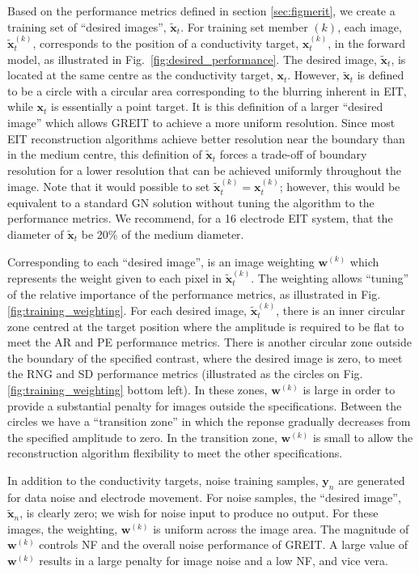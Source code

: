 \documentclass[12pt]{iopart}
\newcommand{\xB}{\mbox{$\mathbf{x}$}}
\newcommand{\xT}{\mbox{$\mathbf{\tilde x}$}}
\newcommand{\yB}{\mbox{$\mathbf{y}$}}
\newcommand{\wB}{\mbox{$\mathbf{w}$}}
\begin{document}
Based on the performance metrics defined
in section \ref{sec:figmerit},
we create a training set of ``desired images'', $\xT_t$.
For training set member $(k)$, each image, $\xT_t^{(k)}$,
corresponds to the position of a conductivity target,
$\xB_t^{(k)}$, in the forward model, as illustrated
in Fig.\ \ref{fig:desired_performance}. The desired
image, $\xT_t$, is located at the same centre as the
conductivity target, $\xB_t$. However,
$\xT_t$ is defined to be a circle with a circular
area corresponding to the blurring inherent in EIT,
while $\xB_t$ is essentially a point target. It is this
definition of a larger ``desired image'' which allows
GREIT to achieve a more uniform resolution.
Since most EIT reconstruction algorithms
achieve better resolution near the boundary than in the medium
centre, this definition of $\xT_t$ forces a trade-off
of boundary resolution for a lower resolution that
can be achieved uniformly throughout the image.
Note that it would possible to set
$\xT_t^{(k)} = \xB_t^{(k)}$; however, this would be equivalent to a standard
GN solution without tuning the algorithm to the 
performance metrics.
We recommend, for a 16 electrode
EIT system, that the diameter of $\xT_t$
be 20\% of the medium diameter.

Corresponding to each ``desired image'', is an image
weighting $\wB^{(k)}$ which represents the weight given to 
each pixel in $\xT_t^{(k)}$. The weighting allows ``tuning''
of the relative importance of the performance metrics,
as illustrated in Fig. \ref{fig:training_weighting}.
For each desired image, $\xT_t^{(k)}$, there is an inner
circular zone centred at the target position
where the amplitude is required to be
flat to meet the AR and PE performance metrics.
There is another circular zone outside the boundary
of the specified contrast, where the desired image
is zero, to meet the RNG and SD performance metrics
(illustrated as the circles on Fig. 
\ref{fig:training_weighting} bottom left).
In these zones, $\wB^{(k)}$ is large in order to
provide a substantial penalty for images outside the
specifications. Between the circles we have a 
``transition zone'' in which the reponse gradually
decreases from the specified amplitude to zero.
In the transition zone, $\wB^{(k)}$ is small to allow 
the reconstruction algorithm flexibility to meet the
other specifications.

In addition to the conductivity targets, noise
training samples, $\yB_n$ are generated for
data noise and electrode movement.
For noise samples, the ``desired image'', $\xT_n$,
is clearly zero; we wish for noise input to produce no output.
For these images, the weighting, $\wB^{(k)}$ is
uniform across the image area. The magnitude
of $\wB^{(k)}$ controls NF and the overall noise
performance of GREIT. A large value of $\wB^{(k)}$ 
results in a large penalty for image noise 
and a low NF, and vice vera.
\end{document}
